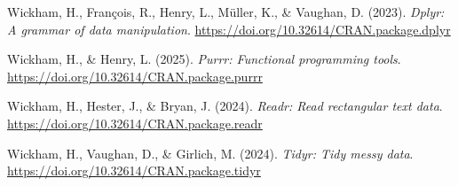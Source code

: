 \documentclass[
  ,man]{apa6}
\newlength{\cslhangindent}
\newenvironment{CSLReferences}[2] %
 {\begin{list}{}{%
  \setlength{\itemindent}{0pt}
  \setlength{\leftmargin}{0pt}
  \setlength{\parsep}{0pt}
  \ifodd #1
   \setlength{\leftmargin}{\cslhangindent}
   \setlength{\itemindent}{-1\cslhangindent}
  \fi
  \setlength{\itemsep}{#2\baselineskip}}}
 {\end{list}}
\begin{document}
\begin{CSLReferences}{1}{0}
Wickham, H., François, R., Henry, L., Müller, K., \& Vaughan, D. (2023). \emph{Dplyr: A grammar of data manipulation}. \url{https://doi.org/10.32614/CRAN.package.dplyr}

Wickham, H., \& Henry, L. (2025). \emph{Purrr: Functional programming tools}. \url{https://doi.org/10.32614/CRAN.package.purrr}

Wickham, H., Hester, J., \& Bryan, J. (2024). \emph{Readr: Read rectangular text data}. \url{https://doi.org/10.32614/CRAN.package.readr}

Wickham, H., Vaughan, D., \& Girlich, M. (2024). \emph{Tidyr: Tidy messy data}. \url{https://doi.org/10.32614/CRAN.package.tidyr}

\end{CSLReferences}


\clearpage
\renewcommand{\listfigurename}{Figure captions}

\clearpage
\renewcommand{\listtablename}{Table captions}
\end{document}
